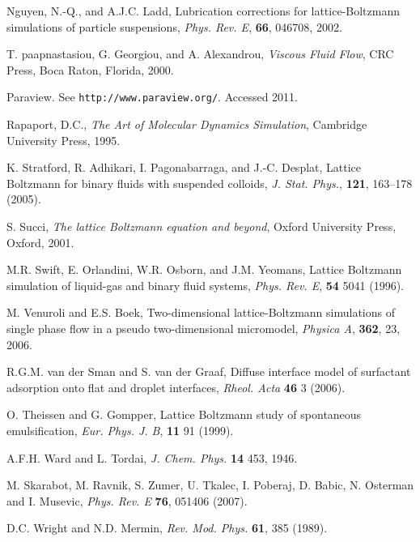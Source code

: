 \begin{thebibliography}{99}
Nguyen, N.-Q., and A.J.C. Ladd, Lubrication corrections for
lattice-Boltzmann simulations of particle suspensions,
\textit{Phys. Rev. E}, \textbf{66}, 046708, 2002.

T. paapnastasiou, G. Georgiou, and A. Alexandrou,
\textit{Viscous Fluid Flow},
CRC Press, Boca Raton, Florida, 2000.

Paraview. See \texttt{http://www.paraview.org/}. Accessed 2011.

Rapaport, D.C., \textit{The Art of Molecular Dynamics Simulation},
Cambridge University Press, 1995.

K. Stratford, R. Adhikari, I. Pagonabarraga, and J.-C. Desplat,
Lattice Boltzmann for binary fluids with suspended colloids,
\textit{J. Stat. Phys.}, \textbf{121}, 163--178 (2005).

S. Succi, \textit{The lattice Boltzmann equation and beyond},
Oxford University Press, Oxford, 2001.

M.R. Swift, E. Orlandini, W.R. Osborn, and J.M. Yeomans,
Lattice Boltzmann simulation of liquid-gas and binary fluid systems,
\textit{Phys. Rev. E}, \textbf{54} 5041 (1996).

M. Venuroli and E.S. Boek,
Two-dimensional lattice-Boltzmann simulations of single phase
flow in a pseudo two-dimensional micromodel,
\textit{Physica A}, \textbf{362}, 23, 2006.

R.G.M. van der Sman and S. van der Graaf,
Diffuse interface model of surfactant adsorption onto flat and
droplet interfaces,
\textit{Rheol. Acta} \textbf{46} 3 (2006).

O. Theissen and G. Gompper,
Lattice Boltzmann study of spontaneous emulsification,
\textit{Eur. Phys. J. B}, \textbf{11} 91 (1999).

A.F.H. Ward and L. Tordai,
\textit{J. Chem. Phys.} \textbf{14} 453, 1946.

M. Skarabot, M. Ravnik, S. Zumer, U. Tkalec, I. Poberaj, D. Babic, N. Osterman and I. Musevic,
\textit{Phys. Rev. E} \textbf{76}, 051406 (2007).

D.C. Wright and N.D. Mermin,
\textit{Rev. Mod. Phys.} \textbf{61}, 385 (1989).


\end{thebibliography}
